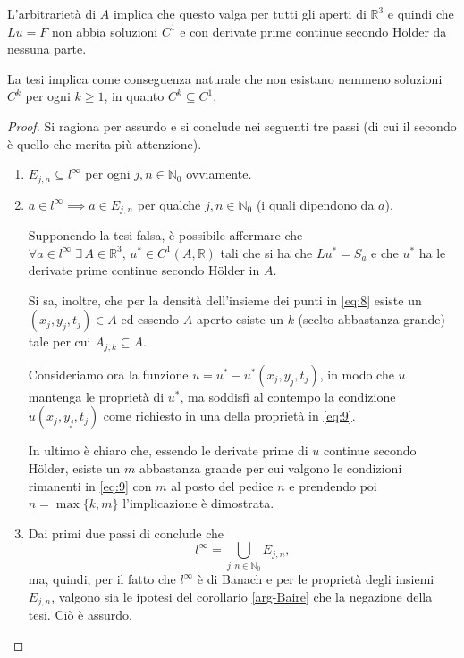 \begin{example}
\begin{remark}
L'arbitrarietà di $A$ implica che questo valga per tutti gli aperti di $\mathbb{R}^3$ e quindi che $Lu=F$ non abbia soluzioni $C^1$ e con derivate prime continue secondo Hölder da nessuna parte. 
\end{remark}

\begin{remark}
La tesi implica come conseguenza naturale che non esistano nemmeno soluzioni $C^k$ per ogni $k \geq 1$, in quanto $C^k \subseteq C^1$.
\end{remark}

\begin{proof}
Si ragiona per assurdo e si conclude nei seguenti tre passi (di cui il secondo è quello che merita più attenzione).
\begin{enumerate}
\item
$E_{j,n} \subseteq l^{\infty} $ per ogni $j,n \in \mathbb{N}_0$ ovviamente.
\item
$a \in l^{\infty} \implies a \in E_{j,n}$ per qualche $j,n \in \mathbb{N}_0$ (i quali  dipendono da $a$).

Supponendo la tesi falsa, è possibile affermare che $\forall a \in l^\infty \; \exists \, A \in \mathbb{R}^3, \, u^* \in C^1(A,\mathbb{R})$ tali che si ha che $Lu^*=S_a$ e che $u^*$ ha le derivate prime continue secondo Hölder in $A$.

Si sa, inoltre, che per la densità dell'insieme dei punti in \eqref{eq:8} esiste un $(x_j,y_j,t_j) \in A$ ed essendo $A$ aperto esiste un $k$ (scelto abbastanza grande) tale per cui $A_{j,k} \subseteq A$.

Consideriamo ora la funzione $u=u^*-u^*(x_j,y_j,t_j)$, in modo che $u$ mantenga le proprietà di $u^*$, ma soddisfi al contempo la condizione $u(x_j,y_j,t_j)$ come richiesto in una della proprietà in \eqref{eq:9}.

In ultimo è chiaro che, essendo le derivate prime di $u$ continue secondo Hölder, esiste un $m$ abbastanza grande per cui valgono le condizioni rimanenti in \eqref{eq:9} con $m$ al posto del pedice $n$ e prendendo poi $n=\max\{k,m\}$ l'implicazione è dimostrata.

\item
Dai primi due passi di conclude che $$l^{\infty}=\bigcup\limits_{j,n \in \mathbb{N}_0}E_{j,n},$$ ma, quindi, per il fatto che $l^{\infty}$ è di Banach e per le proprietà degli insiemi $E_{j,n}$, valgono sia le ipotesi del corollario \ref{arg-Baire} che la negazione della tesi. Ciò è assurdo.
\end{enumerate}
\end{proof}

\end{example}



